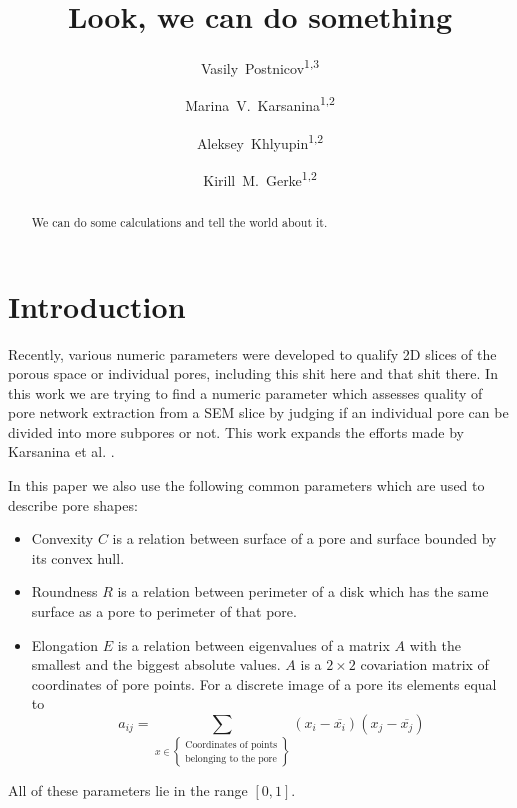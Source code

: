 \documentclass[reprint,amsmath,amssymb,aps,pre,showkeys,showpacs]{revtex4-1}
\newcommand{\highlight}[1]{{\color{red}{#1}}} %
\begin{document}

\author{Vasily~Postnicov\textsuperscript{1,3}}
\author{Marina~V.~Karsanina\textsuperscript{1,2}}
\author{Aleksey~Khlyupin\textsuperscript{1,2}}
\author{Kirill~M.~Gerke\textsuperscript{1,2}}


\title{Look, we can do something}

\begin{abstract}
We can do some calculations and tell the world about it.
\end{abstract}

\maketitle

\section{Introduction}
Recently, various numeric parameters were developed to qualify 2D slices of the
porous space or individual pores, including this shit here and that shit
there. In this work we are trying to find a numeric parameter which assesses
quality of pore network extraction from a SEM slice by judging if an individual
pore can be divided into more subpores or not. This work expands the efforts
made by Karsanina et al.\cite{PLoS_ONE} \highlight{Or not Karsanina. Must point
  to the Skvortsova's parameter}.

In this paper we also use the following common parameters which are used to
describe pore shapes:
\begin{itemize}
\item Convexity $C$ is a relation between surface of a pore and surface bounded
  by its convex hull.
\item Roundness $R$ is a relation between perimeter of a disk which has the same
  surface as a pore to perimeter of that pore.
\item Elongation $E$ is a relation between eigenvalues of a matrix $A$ with the
  smallest and the biggest absolute values. $A$ is a $2 \times 2$ covariation
  matrix of coordinates of pore points. For a discrete image of a pore its
  elements equal to
  \begin{equation*}
    a_{ij} = \sum_{x \in \left\{
      \begin{array}{l}
        \text{Coordinates of points} \\
        \text{belonging to the pore}
      \end{array}
      \right\}} (x_i - \overline{x_i})(x_j - \overline{x_j})
  \end{equation*}
\end{itemize}
All of these parameters lie in the range $[0, 1]$.
\end{document}
